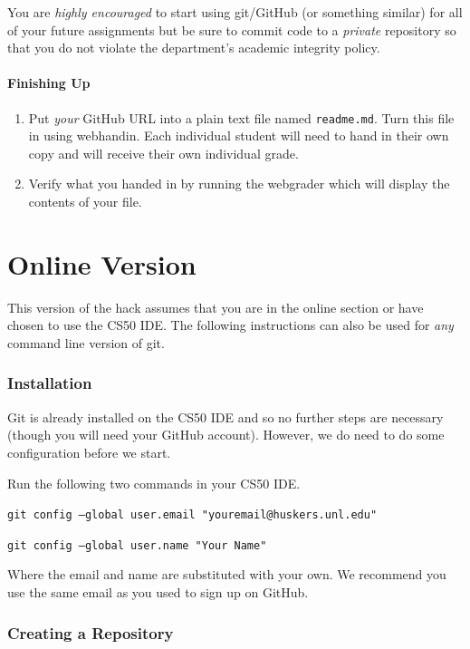\documentclass[12pt]{scrartcl}
\begin{document}
You are \emph{highly encouraged} to start using git/GitHub (or 
something similar) for all of your future assignments 
but be sure to commit code to a \emph{private} repository 
so that you do not violate the department's academic integrity 
policy.  

\subsection{Finishing Up}

\begin{enumerate}
  \item Put \emph{your} GitHub URL into a plain text file named 
  \texttt{readme.md}.  Turn this file
  in using webhandin.  Each individual student will need
  to hand in their own copy and will receive their own individual
  grade.
  \item Verify what you handed in by running the webgrader which will
  display the contents of your file.
\end{enumerate}

\part*{Online Version}
\setcounter{section}{0}

This version of the hack assumes that you are in the online
section or have chosen to use the CS50 IDE.  The following
instructions can also be used for \emph{any} command line 
version of git.

\section{Installation}

Git is already installed on the CS50 IDE and so no further
steps are necessary (though you will need your GitHub account).
However, we do need to do some configuration before we start.

Run the following two commands in your CS50 IDE.  

\texttt{git config --global user.email "youremail@huskers.unl.edu"}

\texttt{git config --global user.name "Your Name"}

Where the email and name are substituted with your own.  We 
recommend you use the same email as you used to sign up on GitHub.

\section{Creating a Repository}
\end{document}
